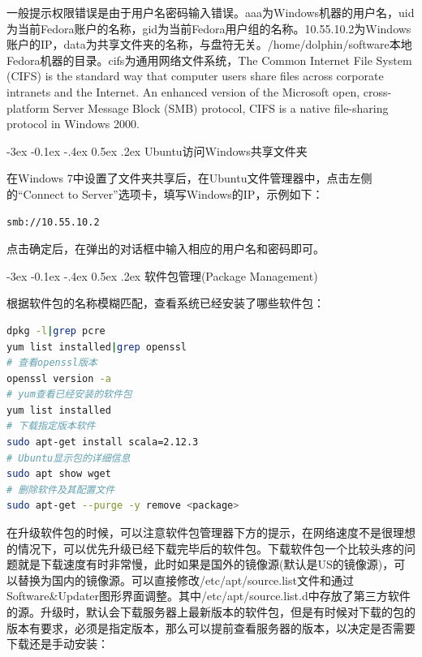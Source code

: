 \documentclass[12pt]{book}
\makeatletter
\numberwithin{dummy}{section}
\theoremstyle{ocrenumbox}
\theoremstyle{blacknumex}
\theoremstyle{blacknumbox}
\theoremstyle{ocrenum}
\renewcommand{\subsection}{\@startsection {subsection}{2}{\z@}
	{-3ex \@plus -0.1ex \@minus -.4ex}
	{0.5ex \@plus.2ex }
	{\normalfont\sffamily\bfseries}}
\makeatother
\begin{document}
一般提示权限错误是由于用户名密码输入错误。aaa为Windows机器的用户名，uid为当前Fedora账户的名称，gid为当前Fedora用户组的名称。10.55.10.2为Windows账户的IP，data为共享文件夹的名称，与盘符无关。/home/dolphin/software本地Fedora机器的目录。cifs为通用网络文件系统，The Common Internet File System (CIFS) is the standard way that computer users share files across corporate intranets and the Internet. An enhanced version of the Microsoft open, cross-platform Server Message Block (SMB) protocol, CIFS is a native file-sharing protocol in Windows 2000.

\subsection{Ubuntu访问Windows共享文件夹}

在Windows 7中设置了文件夹共享后，在Ubuntu文件管理器中，点击左侧的“Connect to Server”选项卡，填写Windows的IP，示例如下：

\begin{lstlisting}[language=HTML]
smb://10.55.10.2
\end{lstlisting}

点击确定后，在弹出的对话框中输入相应的用户名和密码即可。

\subsection{软件包管理(Package Management)}

根据软件包的名称模糊匹配，查看系统已经安装了哪些软件包：

\begin{lstlisting}[language=Bash]
dpkg -l|grep pcre
yum list installed|grep openssl
# 查看openssl版本
openssl version -a
# yum查看已经安装的软件包
yum list installed
# 下载指定版本软件
sudo apt-get install scala=2.12.3
# Ubuntu显示包的详细信息
sudo apt show wget
# 删除软件及其配置文件
sudo apt-get --purge -y remove <package>
\end{lstlisting}

在升级软件包的时候，可以注意软件包管理器下方的提示，在网络速度不是很理想的情况下，可以优先升级已经下载完毕后的软件包。下载软件包一个比较头疼的问题就是下载速度有时非常慢，此时如果是国外的镜像源(默认是US的镜像源)，可以替换为国内的镜像源。可以直接修改/etc/apt/source.list文件和通过Software\&Updater图形界面调整。其中/etc/apt/source.list.d中存放了第三方软件的源。升级时，默认会下载服务器上最新版本的软件包，但是有时候对下载的包的版本有要求，必须是指定版本，那么可以提前查看服务器的版本，以决定是否需要下载还是手动安装：
\end{document}

